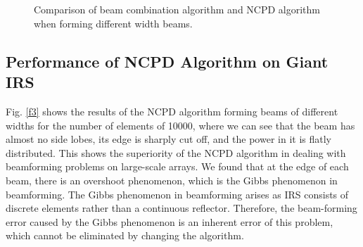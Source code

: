 \documentclass[12pt,draftclsnofoot,onecolumn]{IEEEtran}
\begin{document}
	
	
	\begin{figure}
		\centering
		\\
		\\
		\caption{  Comparison of beam combination algorithm and NCPD algorithm when forming different width beams. }  \label{f2} 
	\end{figure}	
	
	\subsection{Performance of NCPD Algorithm on Giant IRS}	
	Fig. \ref{f3} shows the results of the NCPD algorithm forming beams of different widths for the number of elements of 10000, where we can see that the beam has almost no side lobes, its edge is sharply cut off, and the power in it is flatly distributed. This shows the superiority of the NCPD algorithm in dealing with beamforming problems on large-scale arrays. We found that at the edge of each beam, there is an overshoot phenomenon, which is the Gibbs phenomenon in beamforming. The Gibbs phenomenon in beamforming arises as IRS consists of discrete elements rather than a continuous reflector. Therefore, the beam-forming error caused by the Gibbs phenomenon is an inherent error of this problem, which cannot be eliminated by changing the algorithm.
	
\end{document}
